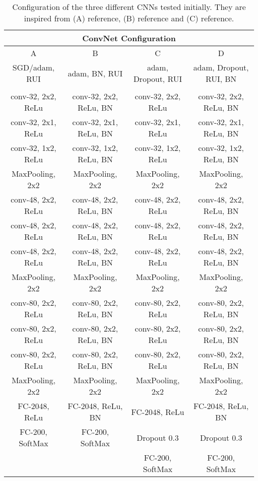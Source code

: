 \medskip
\begin{table}[htbp]
\begin{center}
\begin{tabular}{|c|c|c|c|}

  \hline
  \multicolumn{4}{|c|}{ConvNet Configuration} \\
  \hline

  A & B & C & D
  \\\hline

  SGD/adam, RUI & adam, BN, RUI &  adam, Dropout, RUI & adam, Dropout, RUI, BN
  \\\hhline{|=|=|=|=|}

  \multicolumn{4}{|c|}{input ($64\times64\times3\;RGB\;image$)}
  \\\hline

  conv-32, 2x2, ReLu & conv-32, 2x2, ReLu, BN & conv-32, 2x2, ReLu & conv-32, 2x2, ReLu, BN \\
  conv-32, 2x1, ReLu & conv-32, 2x1, ReLu, BN & conv-32, 2x1, ReLu & conv-32, 2x1, ReLu, BN \\
  conv-32, 1x2, ReLu & conv-32, 1x2, ReLu, BN & conv-32, 1x2, ReLu & conv-32, 1x2, ReLu, BN \\
  \hline
  MaxPooling, 2x2    & MaxPooling, 2x2    & MaxPooling, 2x2    & MaxPooling, 2x2 \\
  \hline
  conv-48, 2x2, ReLu & conv-48, 2x2, ReLu, BN & conv-48, 2x2, ReLu & conv-48, 2x2, ReLu, BN \\
  conv-48, 2x2, ReLu & conv-48, 2x2, ReLu, BN & conv-48, 2x2, ReLu & conv-48, 2x2, ReLu, BN \\
  conv-48, 2x2, ReLu & conv-48, 2x2, ReLu, BN & conv-48, 2x2, ReLu & conv-48, 2x2, ReLu, BN \\
  \hline
  MaxPooling, 2x2    & MaxPooling, 2x2    & MaxPooling, 2x2    & MaxPooling, 2x2 \\
  \hline
  conv-80, 2x2, ReLu & conv-80, 2x2, ReLu, BN & conv-80, 2x2, ReLu & conv-80, 2x2, ReLu, BN \\
  conv-80, 2x2, ReLu & conv-80, 2x2, ReLu, BN & conv-80, 2x2, ReLu & conv-80, 2x2, ReLu, BN \\
  conv-80, 2x2, ReLu & conv-80, 2x2, ReLu, BN & conv-80, 2x2, ReLu & conv-80, 2x2, ReLu, BN \\
  \hline
  MaxPooling, 2x2    & MaxPooling, 2x2        & MaxPooling, 2x2    & MaxPooling, 2x2 \\
  \hline
  FC-2048, ReLu      & FC-2048, ReLu, BN      & FC-2048, ReLu      & FC-2048, ReLu, BN
  \\\hline
  FC-200, SoftMax    & FC-200, SoftMax        & Dropout 0.3        & Dropout 0.3   \\
  \hline
                    &                         & FC-200, SoftMax    & FC-200, SoftMax \\
  \hline
  \end{tabular}
\caption[]
{\small
  Configuration of the three different CNNs tested initially. They are inspired from (A) reference, (B) reference and (C) reference.
}
\label{table:3_configurations}
\end{center}
\end{table}

